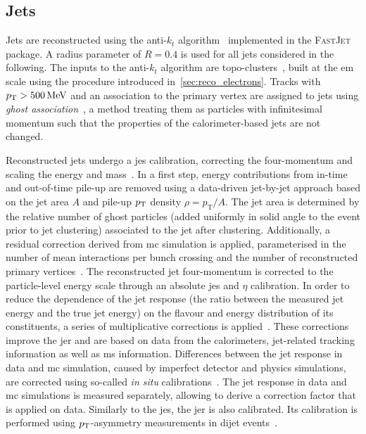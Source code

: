 \subsection{Jets}\label{sec:jets}

Jets are reconstructed using the anti-$k_t$ algorithm~\cite{Cacciari:2008gp} implemented in the \textsc{FastJet}~\cite{Fastjet,Cacciari:2006sm} package.
A radius parameter of $R=0.4$ is used for all jets considered in the following. The inputs to the anti-$k_t$ algorithm are topo-clusters~\cite{Aad:2020flx}, built at the \gls{em} scale using the procedure introduced in~\cref{sec:reco_electrons}.
Tracks with $\pt > \SI{500}{\MeV}$ and an association to the primary vertex are assigned to jets using \textit{ghost association}~\cite{Cacciari:2007fd}, a method treating them as particles with infinitesimal momentum such that the properties of the calorimeter-based jets are not changed. 


Reconstructed jets undergo a \gls{jes} calibration, correcting the four-momentum and scaling the energy and mass~\cite{Aad:2020flx}.
In a first step, energy contributions from in-time and out-of-time pile-up are removed using a data-driven jet-by-jet approach based on the jet area $A$ and pile-up $p_{\textrm{T}}$ density $\rho = p_\mathrm{T}/A$. The jet area is determined by the relative number of ghost particles (added uniformly in solid angle to the event prior to jet clustering) associated to the jet after clustering. 
Additionally, a residual correction derived from \gls{mc} simulation is applied, parameterised in the number of mean interactions per bunch crossing and the number of reconstructed primary vertices~\cite{Aad:2020flx,Cacciari:2007fd}.
The reconstructed jet four-momentum is corrected to the particle-level energy scale through an absolute \gls{jes} and $\eta$ calibration.
In order to reduce the dependence of the jet response (\ie the ratio between the measured jet energy and the true jet energy) on the flavour and energy distribution of its constituents, a series of multiplicative corrections is applied~\cite{PERF-2011-03}.
These corrections improve the \gls{jer} and are based on data from the calorimeters, jet-related tracking information as well as \gls{ms} information.
Differences between the jet response in data and \gls{mc} simulation, caused by imperfect detector and physics simulations, are corrected using so-called \textit{in situ} calibrations~\cite{Aad:2020flx}.
The jet response in data and \gls{mc} simulations is measured separately, allowing to derive a correction factor that is applied on data.
Similarly to the \gls{jes}, the \gls{jer} is also calibrated. Its calibration is performed using $p_{\textrm{T}}$-asymmetry measurements in dijet events~\cite{PERF-2014-02}.

